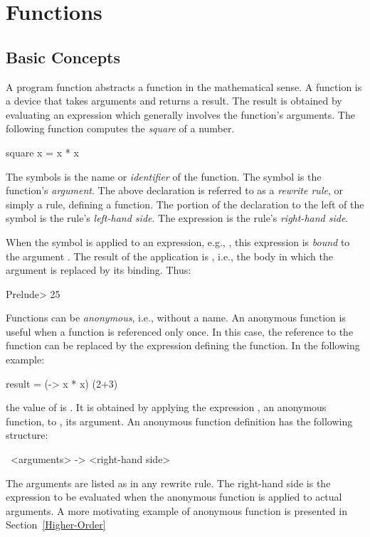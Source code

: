 \section{Functions}

\subsection{Basic Concepts}
\label{Basic concepts}

A program function abstracts a function in the mathematical sense.
A function is a device that takes arguments and returns a result.
The result is obtained by evaluating an expression
which generally involves the function's arguments.
The following function computes the \emph{square} of a number.
%
\begin{curry}
square x = x * x
\end{curry}
%
The symbols  is the name or
\emph{identifier} of the function.
The symbol  is the function's 
\emph{argument}.
The above declaration is referred to as a
\emph{rewrite rule}, or simply a rule,
defining a function.
The portion of the declaration to the left of the symbol \ccode{=}
is the rule's \emph{left-hand side}.
The expression  is the rule's
\emph{right-hand side}.

When the  symbol is applied to an expression,
e.g., , this expression is
\emph{bound}
to the argument .
The result of the application is
, i.e., the body
in which the argument is replaced by its binding.
Thus:
%
\begin{prog}
Prelude> 
25
\end{prog}
%
Functions can be \emph{anonymous},
i.e., without a name.
An anonymous function is useful when a function is referenced
only once.  In this case, the reference to the function
can be replaced by the expression defining the function.
In the following example:
%
\begin{curry}
result = (\x -> x * x) (2+3)
\end{curry}
%
the value of  is .
It is obtained by applying the expression
, an anonymous function,
to , its argument.
An anonymous function definition has the following structure:
%
\begin{curry}
\ <arguments> -> <right-hand side>
\end{curry}
%
The arguments are listed as in any rewrite rule.
The right-hand side is the expression to be evaluated
when the anonymous function is applied to actual arguments.
A more motivating example of anonymous function
is presented in Section~\ref{Higher-Order}

